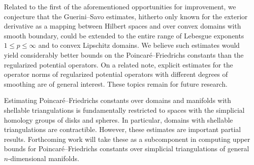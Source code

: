 \documentclass[10pt,letterpaper]{article}
\begin{document}
Related to the first of the aforementioned opportunities for improvement, we conjecture that the Guerini--Savo estimates, hitherto only known for the exterior derivative as a mapping between Hilbert spaces and over convex domains with smooth boundary, could be extended to the entire range of Lebesgue exponents $1 \leq p \leq \infty$ and to convex Lipschitz domains. We believe such estimates would yield considerably better bounds on the Poincar\'e--Friedrichs constants than the regularized potential operators. 
On a related note, explicit estimates for the operator norms of regularized potential operators with different degrees of smoothing are of general interest. 
These topics remain for future research. 

Estimating Poincar\'e--Friedrichs constants over domains and manifolds with shellable triangulations is fundamentally restricted to spaces with the simplicial homology groups of disks and spheres. In particular, domains with shellable triangulations are contractible. However, these estimates are important partial results. Forthcoming work will take these as a subcomponent in computing upper bounds for Poincar\'e--Friedrichs constants over simplicial triangulations of general $n$-dimensional manifolds. 
\\
\end{document}
